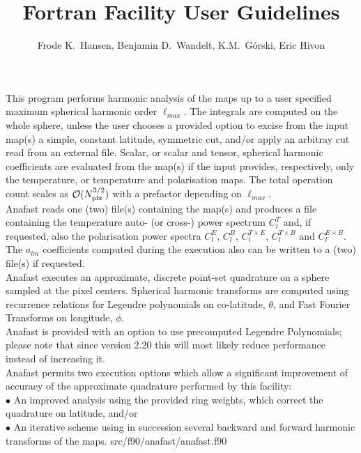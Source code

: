 
\sloppy


\title{\healpix Fortran Facility User Guidelines}
 \section[anafast]{\nosectionname}
\label{fac:anafast}
\author{Frode K.~Hansen, Benjamin D.~Wandelt, K.M.~G\'orski, Eric Hivon}

\begin{facility}
{This program performs harmonic analysis of the \healpix maps 
up to a user
specified maximum spherical harmonic order $\ell_{max}$.
The integrals are computed on the whole sphere, unless the user 
chooses  a provided option 
to excise from the input map(s) a simple, constant latitude, symmetric cut, and/or
apply an arbitray cut read from an external file.
Scalar, or scalar and tensor, spherical harmonic coefficients are evaluated
from the map(s) if the input provides, respectively, only the temperature,
or temperature and polarisation maps.
The total operation count scales as 
${\cal {O}}(N_{\rm pix}^{3/2} )$ with a prefactor
depending on $\ell_{max}$. %
\\ %
Anafast reads one (two) file(s) containing the map(s) and produces 
a file containing the temperature auto- (or cross-) power spectrum
$C^T_l$ and, if requested, 
also the polarisation power spectra $C^E_l$, $C^B_l$, $C^{T\times E}_l$,
$C^{T\times B}_l$ and $C^{E\times B}_l$.
The $a_{lm}$  coefficients computed during the execution also can be  
written to a (two) file(s) if requested. %
\\ %
Anafast executes an approximate, discrete point-set quadrature on 
a sphere
sampled at the \healpix pixel centers.
Spherical harmonic transforms are computed 
using recurrence relations for Legendre polynomials on co-latitude, 
$\theta$, 
and  Fast Fourier Transforms on longitude, $\phi$. %
\\%
Anafast is provided with an option to use precomputed Legendre Polynomials;
please note that since version 2.20 this will most likely reduce performance
instead of increasing it. %
\\%
Anafast permits two execution options 
which allow a significant improvement of accuracy of 
the approximate quadrature performed by this facility:%
\\ %
$\bullet$ An improved analysis using the provided ring weights, 
which correct the quadrature
on latitude, and/or  %
\\%
$\bullet$ An iterative scheme using in 
succession several backward and forward harmonic transforms 
of the maps.}%
{src/f90/anafast/anafast.f90}
\end{facility}


